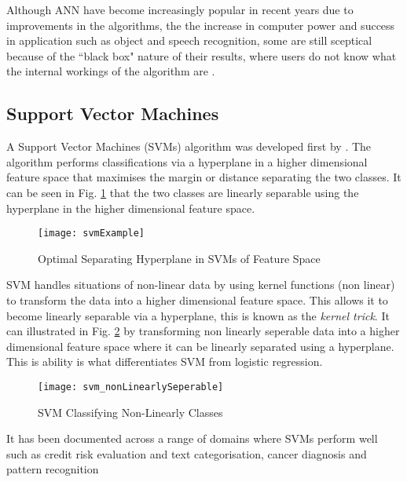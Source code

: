 Although ANN have become increasingly popular in recent years due to improvements in the algorithms, the the increase in computer power and success in application such as object and speech recognition,  some are still sceptical because of the ``black box" nature of their results, where users do not know what the internal workings of the algorithm are  \citep{kaastra_forecasting_1995}. 



\subsection{Support Vector Machines} \label{SVM}
A Support Vector Machines (SVMs) algorithm was developed first by \cite{vapnik_nature_1995}. The algorithm performs classifications via a hyperplane in a higher dimensional feature space that maximises the margin or distance separating the two classes. It can be seen in Fig. \ref{fig:svmExample} that the two classes are linearly separable using the hyperplane in the higher dimensional feature space. 

\begin{figure}[H]
	\texttt{[image: svmExample]}
	\caption{Optimal Separating Hyperplane in SVMs of Feature Space \\
		\cite[Source:][]{li_adaptive_2011}
	}
	\label{fig:svmExample}
\end{figure}

SVM handles situations of non-linear data by using kernel functions (non linear) to transform the data into a higher dimensional feature space. This allows it to become linearly separable via a hyperplane, this is known as the \textit{kernel trick}. It can illustrated in Fig. \ref{fig:svm_nonLinearlySeperable} by transforming non linearly seperable data into a higher dimensional feature space where it can be linearly separated using a hyperplane. This is ability is what differentiates SVM from logistic regression.

\begin{figure}[H]
	\texttt{[image: svm\_nonLinearlySeperable]}
	\caption{SVM Classifying Non-Linearly Classes \\
		\cite[Source:][]{burges_tutorial_1998}
	}
	\label{fig:svm_nonLinearlySeperable}
\end{figure}

It has been documented across a range of domains where SVMs perform well such as credit risk evaluation \citep{van_gestel_credit_2009} and text categorisation, cancer diagnosis and pattern recognition \citep{shin_application_2005}

